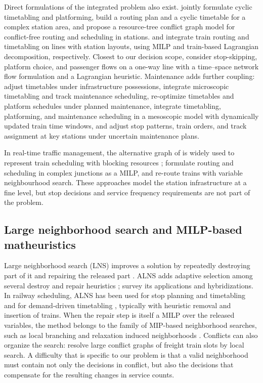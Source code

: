 Direct formulations of the integrated problem also exist. \citet{Petering2016} jointly formulate cyclic timetabling and platforming, \citet{Burggraeve2017} build a routing plan and a cyclic timetable for a complex station area, and \citet{Caimi2011} propose a resource-tree conflict graph model for conflict-free routing and scheduling in stations. \citet{Xu2017} and \citet{Zhou2016} integrate train routing and timetabling on lines with station layouts, using MILP and train-based Lagrangian decomposition, respectively. Closest to our decision scope, \citet{Xu2021} consider stop-skipping, platform choice, and passenger flows on a one-way line with a time--space network flow formulation and a Lagrangian heuristic. Maintenance adds further coupling: \citet{VanAken2017} adjust timetables under infrastructure possessions, \citet{ZhangY2019a} integrate microscopic timetabling and track maintenance scheduling, \citet{ZhangQ2020} re-optimize timetables and platform schedules under planned maintenance, \citet{ZhangQ2022} integrate timetabling, platforming, and maintenance scheduling in a mesoscopic model with dynamically updated train time windows, and \citet{Ji2024} adjust stop patterns, train orders, and track assignment at key stations under uncertain maintenance plans.

In real-time traffic management, the alternative graph of \citet{Mascis2002} is widely used to represent train scheduling with blocking resources \citep{DAriano2007}; \citet{Pellegrini2014} formulate routing and scheduling in complex junctions as a MILP, and \citet{Sama2017} re-route trains with variable neighbourhood search. These approaches model the station infrastructure at a fine level, but stop decisions and service frequency requirements are not part of the problem.

\subsection{Large neighborhood search and MILP-based matheuristics}
Large neighborhood search (LNS) improves a solution by repeatedly destroying part of it and repairing the released part \citep{Shaw1998}. ALNS adds adaptive selection among several destroy and repair heuristics \citep{Ropke2006,Pisinger2007}; \citet{Mara2022} survey its applications and hybridizations. In railway scheduling, ALNS has been used for stop planning and timetabling \citep{Dong2020} and for demand-driven timetabling \citep{Yin2024}, typically with heuristic removal and insertion of trains. When the repair step is itself a MILP over the released variables, the method belongs to the family of MIP-based neighborhood searches, such as local branching \citep{Fischetti2003} and relaxation induced neighborhoods \citep{Danna2005}. Conflicts can also organize the search: \citet{Reisch2021} resolve large conflict graphs of freight train slots by local search. A difficulty that is specific to our problem is that a valid neighborhood must contain not only the decisions in conflict, but also the decisions that compensate for the resulting changes in service counts.

